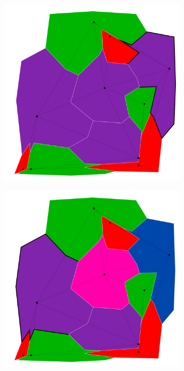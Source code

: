 \documentclass{article}
\begin{document}
\begin{figure}[h!]
			\begin{subfigure}{0.18\textwidth}
				\centering
				\includegraphics[width=\textwidth]{images/sequences/forward_backtracking/bt_forward_I00013}
				\caption{}
				\label{high_f1}
			\end{subfigure}
			\;
			\begin{subfigure}{0.18\textwidth}
				\centering
				\includegraphics[width=\textwidth]{images/sequences/forward_backtracking/bt_forward_I00015}

\end{subfigure}
\end{figure}
\end{document}
